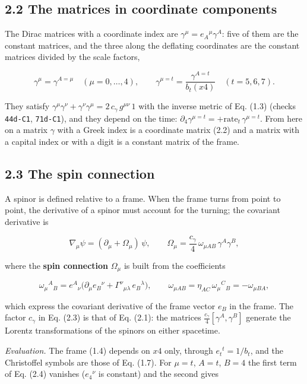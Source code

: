 \documentclass[
  10pt,
]{article}
\begin{document}
\hypertarget{the-matrices-in-coordinate-components}{%
\subsection{2.2 The matrices in coordinate
components}\label{the-matrices-in-coordinate-components}}

The Dirac matrices with a coordinate index are
\(\gamma^\mu=e_A{}^\mu\gamma^A\): five of them are the constant
matrices, and the three along the deflating coordinates are the constant
matrices divided by the scale factors,

\[\gamma^\mu=\gamma^{A=\mu}\quad(\mu=0,\dots,4),\qquad
\gamma^{\mu=t}=\frac{\gamma^{A=t}}{b_t(x4)}\quad(t=5,6,7).\tag{2.2}\]

They satisfy
\(\gamma^\mu\gamma^\nu+\gamma^\nu\gamma^\mu=2\,c_\gamma\,g^{\mu\nu}\,1\)
with the inverse metric of Eq. (1.3) (checks \texttt{44d-C1},
\texttt{71d-C1}), and they depend on the time:
\(\partial_4\gamma^{\mu=t}=+\mathrm{rate}_t\,\gamma^{\mu=t}\). From here
on a matrix \(\gamma\) with a Greek index is a coordinate matrix (2.2)
and a matrix with a capital index or with a digit is a constant matrix
of the frame.

\hypertarget{the-spin-connection}{%
\subsection{2.3 The spin connection}\label{the-spin-connection}}

A spinor is defined relative to a frame. When the frame turns from point
to point, the derivative of a spinor must account for the turning; the
covariant derivative is

\[\nabla_\mu\psi=(\partial_\mu+\Omega_\mu)\,\psi,\qquad
\Omega_\mu=\frac{c_\gamma}{4}\,\omega_{\mu AB}\,\gamma^A\gamma^B,\tag{2.3}\]

where the \textbf{spin connection} \(\Omega_\mu\) is built from the
coefficients

\[\omega_\mu{}^A{}_B=e^A{}_\nu\big(\partial_\mu e_B{}^\nu+\Gamma^\nu{}_{\mu\lambda}\,e_B{}^\lambda\big),\qquad
\omega_{\mu AB}=\eta_{AC}\,\omega_\mu{}^C{}_B=-\omega_{\mu BA},\tag{2.4}\]

which express the covariant derivative of the frame vector \(e_B\) in
the frame. The factor \(c_\gamma\) in Eq. (2.3) is that of Eq. (2.1):
the matrices \(\tfrac{c_\gamma}{4}[\gamma^A,\gamma^B]\) generate the
Lorentz transformations of the spinors on either spacetime.

\emph{Evaluation.} The frame (1.4) depends on \(x4\) only, through
\(e_t{}^t=1/b_t\), and the Christoffel symbols are those of Eq. (1.7).
For \(\mu=t\), \(A=t\), \(B=4\) the first term of Eq. (2.4) vanishes
(\(e_4{}^\nu\) is constant) and the second gives
\end{document}
